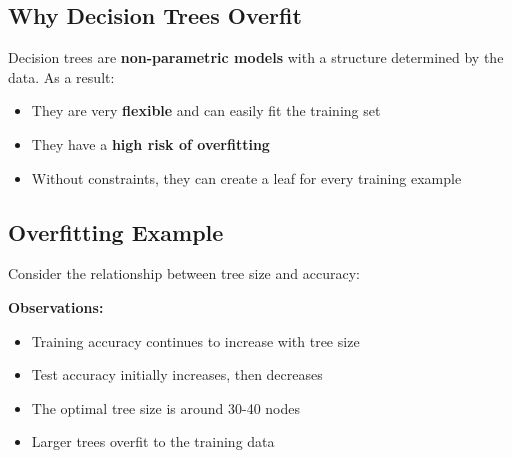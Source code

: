 \documentclass[11pt,a4paper]{article}
\theoremstyle{definition}
\theoremstyle{plain}
\theoremstyle{remark}
\begin{document}
\subsection{Why Decision Trees Overfit}

Decision trees are \textbf{non-parametric models} with a structure determined by the data. As a result:

\begin{itemize}
    \item They are very \textbf{flexible} and can easily fit the training set
    \item They have a \textbf{high risk of overfitting}
    \item Without constraints, they can create a leaf for every training example
\end{itemize}

\subsection{Overfitting Example}

Consider the relationship between tree size and accuracy:

\begin{center}
\end{center}

\textbf{Observations:}
\begin{itemize}
    \item Training accuracy continues to increase with tree size
    \item Test accuracy initially increases, then decreases
    \item The optimal tree size is around 30-40 nodes
    \item Larger trees overfit to the training data
\end{itemize}
\end{document}
